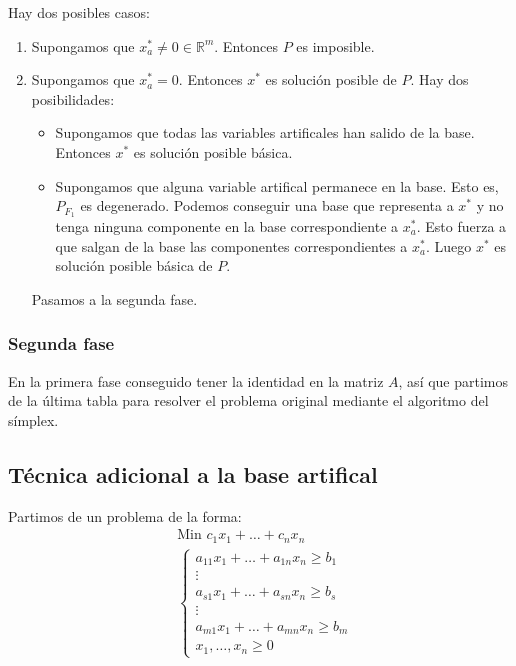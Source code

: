 Hay dos posibles casos:
\begin{enumerate}
    \item Supongamos que $x_a^\ast \neq 0 \in \mathbb{R}^m$.
          Entonces $P$ es imposible.
    \item Supongamos que $x_a^\ast = 0$.
          Entonces $x^\ast$ es solución posible de $P$.
          Hay dos posibilidades:
          \begin{itemize}
              \item Supongamos que todas las variables artificales han salido de la base.
                    Entonces $x^\ast$ es solución posible básica.
              \item Supongamos que alguna variable artifical permanece en la base.
                    Esto es, $P_{F_1}$ es degenerado.
                    Podemos conseguir una base que representa a $x^\ast$ y no tenga ninguna componente en la base correspondiente a $x_a^\ast$.
                    Esto fuerza a que salgan de la base las componentes correspondientes a $x_a^\ast$.
                    Luego $x^\ast$ es solución posible básica de $P$.
          \end{itemize}
          Pasamos a la segunda fase.
\end{enumerate}

\subsubsection*{Segunda fase}
En la primera fase conseguido tener la identidad en la matriz $A$, así que partimos de la última tabla para resolver el problema original mediante el algoritmo del símplex.

\subsection*{Técnica adicional a la base artifical}
Partimos de un problema de la forma:
\begin{align*}
     & \text{Min } c_1x_1 + \dots + c_nx_n    \\
     & \begin{cases}
           a_{11}x_1 + \dots + a_{1n}x_n \geq b_1 \\
           \vdots                                 \\
           a_{s1}x_1 + \dots + a_{sn}x_n \geq b_s \\
           \vdots                                 \\
           a_{m1}x_1 + \dots + a_{mn}x_n \geq b_m \\
           x_1, \dots, x_n \geq 0
       \end{cases}
\end{align*}

